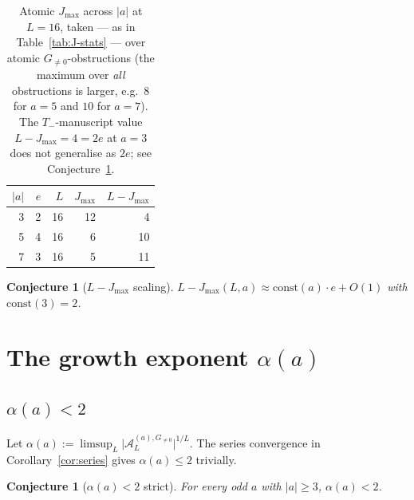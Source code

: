 \documentclass[11pt,reqno]{amsart}
\theoremstyle{plain}
\newtheorem{conjecture}[theorem]{Conjecture}
\theoremstyle{definition}
\theoremstyle{remark}
\newcommand{\Tneg}{T_{-}}
\newcommand{\Atom}{\mathcal{A}}
\begin{document}
\begin{table}[ht]
\centering
\begin{tabular}{rrrrr}
\toprule
$\lvert a \rvert$ & $e$ & $L$ & $J_{\max}$ & $L - J_{\max}$ \\
\midrule
3 & 2 & 16 & 12 & 4 \\
5 & 4 & 16 & 6 & 10 \\
7 & 3 & 16 & 5 & 11 \\
\bottomrule
\end{tabular}
\caption{Atomic $J_{\max}$ across $\lvert a \rvert$ at $L = 16$, taken --- as
in Table~\ref{tab:J-stats} --- over atomic $G_{\ne 0}$-obstructions (the
maximum over \emph{all} obstructions is larger, e.g.\ $8$ for $a = 5$ and
$10$ for $a = 7$). The $\Tneg$-manuscript value $L - J_{\max} = 4 = 2e$ at
$a = 3$ does not generalise as $2e$; see Conjecture~\ref{conj:Jmax-scaling}.}
\label{tab:Jmax-a}
\end{table}

\begin{conjecture}[$L - J_{\max}$ scaling]\label{conj:Jmax-scaling}
$L - J_{\max}(L, a) \approx \mathrm{const}(a) \cdot e + O(1)$ with
$\mathrm{const}(3) = 2$.
\end{conjecture}

\section{The growth exponent \texorpdfstring{$\alpha(a)$}{alpha(a)}}\label{sec:spectral}

\subsection{\texorpdfstring{$\alpha(a) < 2$}{alpha(a) < 2}}

Let $\alpha(a) := \limsup_L \lvert \Atom_L^{(a), G_{\ne 0}} \rvert^{1/L}$.
The series convergence in Corollary~\ref{cor:series} gives $\alpha(a)
\le 2$ trivially.

\begin{conjecture}[$\alpha(a) < 2$ strict]\label{conj:alpha}
For every odd $a$ with $\lvert a \rvert \ge 3$, $\alpha(a) < 2$.
\end{conjecture}
\end{document}
